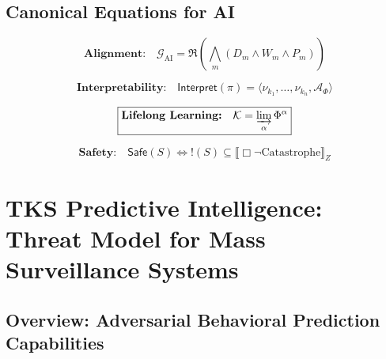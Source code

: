 \documentclass[11pt,twoside]{book}
\theoremstyle{definition}
\theoremstyle{plain}
\theoremstyle{remark}
\newcommand{\sem}[1]{\llbracket #1 \rrbracket}
\newcommand{\noe}[1]{\nu_{#1}}
\newcommand{\TransFrac}[1]{\Phi^{#1}}
\newcommand{\RPM}{\mathfrak{R}}
\newcommand{\FractalAttractor}{\mathcal{A}_\Phi}
\newcommand{\AIGoal}{\mathcal{G}_{\mathrm{AI}}}
\newcommand{\Interpret}{\mathsf{Interpret}}
\begin{document}
\chapter{Canonical Equations for AI}
\label{ch:ai-equations}

\begin{equation}
\boxed{
    \textbf{Alignment:} \quad \AIGoal = \RPM\left(\bigwedge_m (D_m \wedge W_m \wedge P_m)\right)
}
\end{equation}

\begin{equation}
\boxed{
    \textbf{Interpretability:} \quad \Interpret(\pi) = \langle \noe{k_1}, \ldots, \noe{k_n}, \FractalAttractor \rangle
}
\end{equation}

\begin{equation}
\boxed{
    \textbf{Lifelong Learning:} \quad \mathcal{K} = \varinjlim_\alpha \TransFrac{\alpha}
}
\end{equation}

\begin{equation}
\boxed{
    \textbf{Safety:} \quad \mathsf{Safe}(S) \iff !(S) \subseteq \sem{\Box \neg \mathrm{Catastrophe}}_Z
}
\end{equation}

\part{TKS Predictive Intelligence: Threat Model for Mass Surveillance Systems}
\label{part:predictive}

\chapter{Overview: Adversarial Behavioral Prediction Capabilities}
\label{ch:pred-overview}
\end{document}
